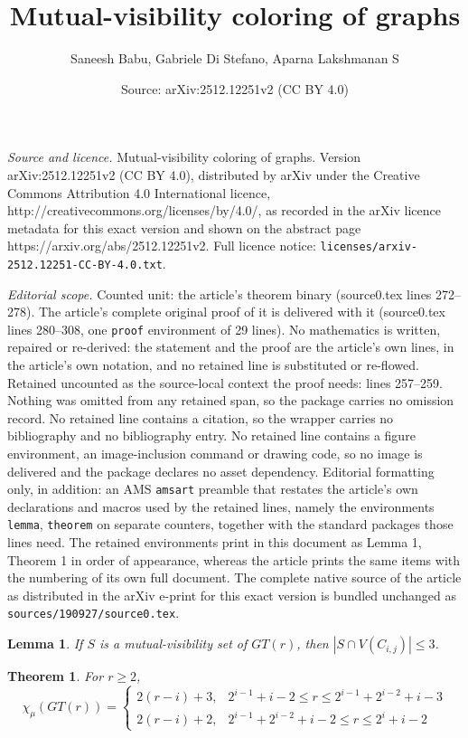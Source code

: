 \documentclass[10pt,a4paper]{amsart}
\title{Mutual-visibility coloring of graphs}
\author{Saneesh Babu, Gabriele Di Stefano, Aparna Lakshmanan S}
\date{Source: arXiv:2512.12251v2 (CC BY 4.0)}
\newtheorem{lemma}{Lemma}
\newtheorem{theorem}{Theorem}
\begin{document}
\maketitle

\noindent\emph{Source and licence.} Mutual-visibility coloring of graphs. Version arXiv:2512.12251v2 (CC BY 4.0), distributed by arXiv under the Creative Commons Attribution 4.0 International licence, http://creativecommons.org/licenses/by/4.0/, as recorded in the arXiv licence metadata for this exact version and shown on the abstract page https://arxiv.org/abs/2512.12251v2. Full licence notice: \texttt{licenses/arxiv-2512.12251-CC-BY-4.0.txt}.\par\smallskip

\noindent\textit{Editorial scope.} Counted unit: the article's theorem binary (source0.tex lines 272--278). The article's complete original proof of it is delivered with it (source0.tex lines 280--308, one \texttt{proof} environment of 29 lines). No mathematics is written, repaired or re-derived: the statement and the proof are the article's own lines, in the article's own notation, and no retained line is substituted or re-flowed.  Retained uncounted as the source-local context the proof needs: lines 257--259.  Nothing was omitted from any retained span, so the package carries no omission record.  No retained line contains a citation, so the wrapper carries no bibliography and no bibliography entry.  No retained line contains a figure environment, an image-inclusion command or drawing code, so no image is delivered and the package declares no asset dependency.  Editorial formatting only, in addition: an AMS \texttt{amsart} preamble that restates the article's own declarations and macros used by the retained lines, namely the environments \texttt{lemma}, \texttt{theorem} on separate counters, together with the standard packages those lines need.  The retained environments print in this document as Lemma 1, Theorem 1 in order of appearance, whereas the article prints the same items with the numbering of its own full document.  The complete native source of the article as distributed in the arXiv e-print for this exact version is bundled unchanged as \texttt{sources/190927/source0.tex}.
\begin{lemma} \label{lem}
If $S$ is a mutual-visibility set of $GT(r)$, then $|{S \cap V(C_{i,j}) }| \leq 3 $.
\end{lemma}

\begin{theorem} \label{binary}
For $r \geq 2$,
	$$\chi_\mu(GT(r))=\begin{cases}
        2(r-i) + 3, & 2^{i-1}+i-2 \leq r \leq 2^{i-1}+2^{i-2}+i-3\\
	    2(r-i) + 2, & 2^{i-1}+2^{i-2}+i-2 \leq r \leq 2^i + i - 2       
	\end{cases}$$
\end{theorem} 
\end{document}
